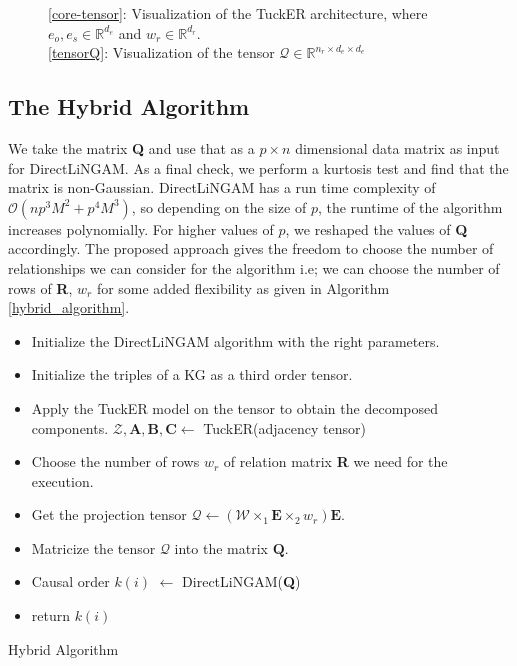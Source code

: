 \documentclass{article}
\begin{document}
\begin{figure}%
    \centering
    \qquad
    \caption{\ref{core-tensor}: Visualization of the TuckER architecture, where $e_o, e_s \in \mathbb{R}^{d_e}$ and $w_r \in \mathbb{R}^{d_r}$.\\ 
    \ref{tensorQ}: Visualization of the tensor $\mathcal{Q} \in \mathbb{R}^{n_r \times d_e \times d_e}$}%
    \label{kg-rep}%
\end{figure}
\subsection{The Hybrid Algorithm}
We take the matrix \textbf{Q} and use that as a $p \times n$ dimensional data matrix as input for DirectLiNGAM. As a final check, we perform a kurtosis test and find that the matrix is non-Gaussian. DirectLiNGAM has a run time complexity of $\mathcal{O}(np^3M^2 + p^4M^3)$, so depending on the size of $p$, the runtime of the algorithm increases polynomially. For higher values of $p$, we reshaped the values of \textbf {Q} accordingly. The proposed approach gives the freedom to choose the number of relationships we can consider for the algorithm i.e; we can choose the number of rows of \textbf{R}, $w_r$ for some added flexibility as given in Algorithm \ref{hybrid_algorithm}.

\begin{algorithm}[H]
\label{hybrid_algorithm}
\SetAlgoLined
{}
\begin{itemize}
    \item Initialize the DirectLiNGAM algorithm with the right parameters.
    \item Initialize the triples of a KG as a third order tensor.
    \item Apply the TuckER model on the tensor to obtain the decomposed components.
    $\mathcal{Z},\textbf{A},\textbf{B},\textbf{C} \leftarrow$ TuckER(adjacency tensor)
    \item Choose the number of rows $w_r$ of relation matrix \textbf{R} we need for the execution.
    \item Get the projection tensor $\mathcal{Q} \leftarrow   (\mathcal{W} \times_1 \textbf{E} \times_2 w_r)\textbf{E}$.
    \item Matricize the tensor $\mathcal{Q}$ into the matrix $\textbf{Q}$.
    \item Causal order $k(i)$ $\leftarrow$ DirectLiNGAM(\textbf{Q})
    \item return $k(i)$
    
\end{itemize}
 \caption{Hybrid Algorithm}
\end{algorithm}
\end{document}
